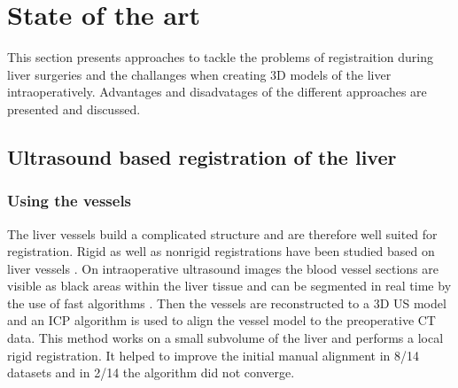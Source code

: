 \chapter{State of the art}
This section presents approaches to tackle the problems of registraition during
liver surgeries and the challanges when creating 3D models of the liver
intraoperatively. Advantages and disadvatages of the different approaches are
presented and discussed.
\section{Ultrasound based registration of the liver}



\subsection{Using the vessels}
The liver vessels build a complicated structure and are
therefore well suited for registration. Rigid as well as nonrigid registrations
have been studied based on liver vessels \cite{ribes2012image}\cite{lange20093d}. 
On intraoperative ultrasound images the
blood vessel sections are visible as black areas within the liver tissue and can
be segmented in real time by the use of fast algorithms \cite{ribes2012image}. Then the
vessels are 
reconstructed to a 3D US model and an ICP algorithm is used to align the vessel model to
the preoperative CT data. This method works on a small subvolume of the liver
and performs a local rigid registration. It helped to improve the
initial manual alignment in 8/14 datasets and in 2/14 the algorithm did not converge.



